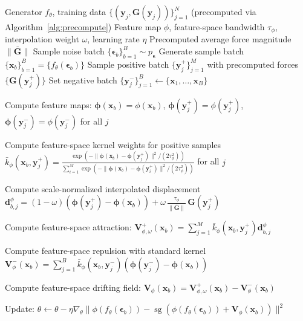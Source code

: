 \documentclass[11pt]{article}
\newcommand{\bx}{\mathbf{x}}
\newcommand{\by}{\mathbf{y}}
\newcommand{\bV}{\mathbf{V}}
\newcommand{\bG}{\mathbf{G}}
\newcommand{\beps}{\boldsymbol{\epsilon}}
\newcommand{\bphi}{\boldsymbol{\phi}}
\newcommand{\kbar}{\bar{k}}
\newcommand{\sg}{\operatorname{sg}}
\begin{document}
\begin{algorithm}[t]
\caption{Feature-Space Force-Interpolated Drifting Training}
\label{alg:feature-force-interp}
\begin{algorithmic}[1]
\REQUIRE Generator $f_\theta$, training data $\{(\by_j, \bG(\by_j))\}_{j=1}^N$ (precomputed via Algorithm~\ref{alg:precompute})
\REQUIRE Feature map $\phi$, feature-space bandwidth $\tau_\phi$, interpolation weight $\omega$, learning rate $\eta$
\REQUIRE Precomputed average force magnitude $\overline{\|\bG\|}$
    \STATE Sample noise batch $\{\beps_b\}_{b=1}^B \sim p_{\beps}$
    \STATE Generate sample batch $\{\bx_b\}_{b=1}^B = \{f_\theta(\beps_b)\}$  
    \STATE Sample positive batch $\{\by_j^+\}_{j=1}^M$ with precomputed forces $\{\bG(\by_j^+)\}$
    \STATE Set negative batch $\{\by_j^-\}_{j=1}^B \leftarrow \{\bx_1, \ldots, \bx_B\}$ 

        \STATE Compute feature maps: $\bphi(\bx_b) = \phi(\bx_b)$, $\bphi(\by_j^+) = \phi(\by_j^+)$, $\bphi(\by_j^-) = \phi(\by_j^-)$ for all $j$

        \STATE Compute feature-space kernel weights for positive samples
        \STATE $\kbar_\phi(\bx_b, \by_j^+) = \frac{\exp(-\|\bphi(\bx_b) - \bphi(\by_j^+)\|^2/(2\tau_\phi^2))}{\sum_{i=1}^M \exp(-\|\bphi(\bx_b) - \bphi(\by_i^+)\|^2/(2\tau_\phi^2))}$ for all $j$

        \STATE Compute scale-normalized interpolated displacement
        \STATE $\mathbf{d}_{b,j}^\phi = (1-\omega)(\bphi(\by_j^+) - \bphi(\bx_b)) + \omega\,\frac{\tau_\phi}{\overline{\|\bG\|}}\,\bG(\by_j^+)$ 

        \STATE Compute feature-space attraction: $\bV_{\phi,\omega}^+(\bx_b) = \sum_{j=1}^M \kbar_\phi(\bx_b,\by_j^+) \mathbf{d}_{b,j}^\phi$

        \STATE Compute feature-space repulsion with standard kernel
        \STATE $\bV_\phi^-(\bx_b) = \sum_{j=1}^B \kbar_\phi(\bx_b,\by_j^-) (\bphi(\by_j^-) - \bphi(\bx_b))$

        \STATE Compute feature-space drifting field: $\bV_\phi(\bx_b) = \bV_{\phi,\omega}^+(\bx_b) - \bV_\phi^-(\bx_b)$

        \STATE Update: $\theta \leftarrow \theta - \eta\nabla_\theta \|\phi(f_\theta(\beps_b)) - \sg(\phi(f_\theta(\beps_b)) + \bV_\phi(\bx_b))\|^2$ 
    \ENDFOR
\ENDWHILE
\end{algorithmic}
\end{algorithm}
\end{document}
